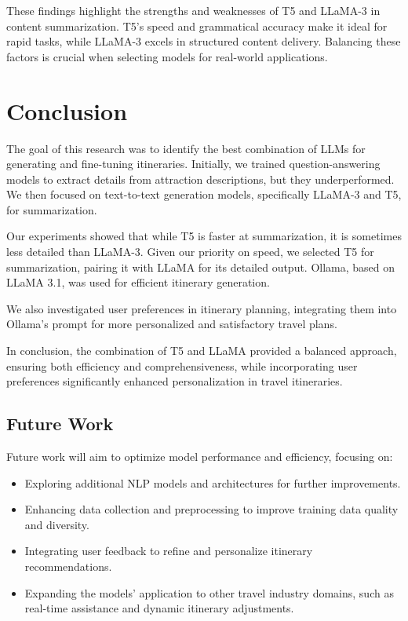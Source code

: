 \documentclass[conference]{IEEEtran}
\begin{document}
    These findings highlight the strengths and weaknesses of T5 and LLaMA-3 in content summarization. T5's speed and grammatical accuracy make it ideal for rapid tasks, while LLaMA-3 excels in structured content delivery. Balancing these factors is crucial when selecting models for real-world applications.


\section{Conclusion}

    The goal of this research was to identify the best combination of LLMs for generating and fine-tuning itineraries. Initially, we trained question-answering models to extract details from attraction descriptions, but they underperformed. We then focused on text-to-text generation models, specifically LLaMA-3 and T5, for summarization.

    Our experiments showed that while T5 is faster at summarization, it is sometimes less detailed than LLaMA-3. Given our priority on speed, we selected T5 for summarization, pairing it with LLaMA for its detailed output. Ollama, based on LLaMA 3.1, was used for efficient itinerary generation.

    We also investigated user preferences in itinerary planning, integrating them into Ollama's prompt for more personalized and satisfactory travel plans.

    In conclusion, the combination of T5 and LLaMA provided a balanced approach, ensuring both efficiency and comprehensiveness, while incorporating user preferences significantly enhanced personalization in travel itineraries.


    \subsection{Future Work}

        Future work will aim to optimize model performance and efficiency, focusing on:
        \begin{itemize}
            \item Exploring additional NLP models and architectures for further improvements.
            \item Enhancing data collection and preprocessing to improve training data quality and diversity.
            \item Integrating user feedback to refine and personalize itinerary recommendations.
            \item Expanding the models' application to other travel industry domains, such as real-time assistance and dynamic itinerary adjustments.
        \end{itemize}
\end{document}
